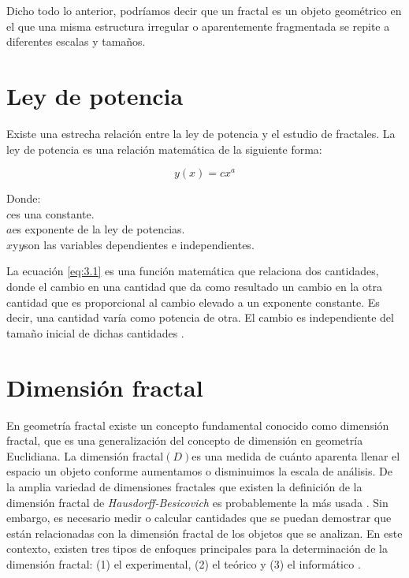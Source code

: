 Dicho todo lo anterior, podr\'{i}amos decir que un fractal es un objeto geom\'{e}trico en el que una misma estructura irregular o aparentemente fragmentada se repite a diferentes escalas y tamaños. 

\section{Ley de potencia} 

Existe una estrecha relaci\'{o}n entre la ley de potencia y el estudio de fractales. La ley de potencia es una relaci\'{o}n matem\'{a}tica de la siguiente forma:

\begin{equation}
	y(x) = cx^{a}
	\label{eq:3.1}
\end{equation}

Donde:\\
$c$es una constante.\\
$a$es exponente de la ley de potencias.\\
$x$y$y$son las variables dependientes e independientes. 

La ecuaci\'{o}n \ref{eq:3.1} es una funci\'{o}n matem\'{a}tica que relaciona dos cantidades, donde el cambio en una cantidad que da como resultado un cambio en la otra cantidad que es proporcional al cambio elevado a un exponente constante. Es decir, una cantidad var\'{i}a como potencia de otra. El cambio es independiente del tamaño inicial de dichas cantidades \cite{Meakin1998}.

\color{blue}

\section{Dimensi\'{o}n fractal}

En geometr\'{i}a fractal existe un concepto fundamental conocido como dimensi\'{o}n fractal, que es una generalizaci\'{o}n del concepto de dimensi\'{o}n en geometr\'{i}a Euclidiana. La dimensi\'{o}n fractal$(D)$es una medida de cu\'{a}nto aparenta llenar el espacio un objeto conforme aumentamos o disminuimos la escala de an\'{a}lisis. De la  amplia variedad de dimensiones fractales que existen la definici\'{o}n de la dimensi\'{o}n fractal de \textit{Hausdorff-Besicovich} es probablemente la m\'{a}s usada \cite{Vicsek1992, Meakin1998}. Sin embargo, es necesario medir o calcular cantidades que se puedan demostrar que est\'{a}n relacionadas con la dimensi\'{o}n fractal de los objetos que se analizan. En este contexto, existen  tres tipos de enfoques principales para la determinaci\'{o}n de la dimensi\'{o}n fractal: (1) el experimental, (2) el te\'{o}rico y (3) el inform\'{a}tico \cite{Vicsek1992}.

